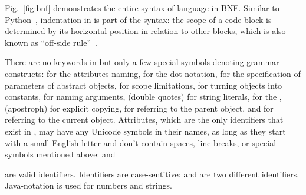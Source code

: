 Fig.~\ref{fig:bnf} demonstrates the entire syntax of \eo{} language in BNF.
Similar to Python~\citep{lutz2013learning}, indentation in \eo{} is part of the syntax:
the scope of a code block is determined by its horizontal position
in relation to other blocks, which is also known as ``off-side rule''~\citep{landin1966next}.

There are no keywords in \eo{} but only a few special symbols
denoting grammar constructs:
  \ff{>} for the attributes naming,
   for the dot notation,
  \ff{[]} for the specification of parameters of abstract objects,
  \ff{()} for scope limitations,
  \ff{!} for turning objects into constants,
  \ff{:} for naming arguments,
   (double quotes) for string literals,
   for the ,
   (apostroph) for explicit copying,
  \ff{\^{}} for referring to the parent object,
  and
  \ff{\$} for referring to the current object.
Attributes, which are the only identifiers that exist in \eo{}, may have
any Unicode symbols in their names, as long as they start with a small English letter
and don't contain spaces, line breaks, or special symbols mentioned above:
 and
\begin{CJK}{UTF8}{gbsn}
\end{CJK}
 are valid identifiers.
Identifiers are case-sentitive:  and  are two different identifiers.
Java-notation is used for numbers and strings.

